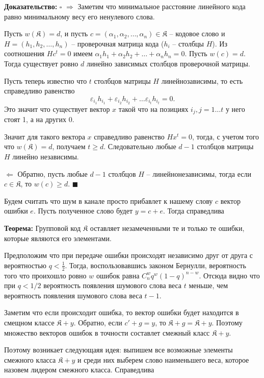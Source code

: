 \documentclass{article}
\newcommand{\THRM}[1] {
    \textbf{Теорема: } #1
}
\newcommand{\PROOF}[1] {
    \textbf{Доказательство: } $\square$ #1 $\blacksquare$
}
\newcommand{\eps}{\varepsilon}
\begin{document}
    \PROOF{
        $\Rightarrow$ Заметим что минимальное расстояние линейного кода равно минимальному весу его ненулевого слова.

        Пусть $w(\mathfrak{K}) = d$, и пусть $c = (\alpha_1, \alpha_2, \dots , \alpha_n) \in \mathfrak{K}$ -- кодовое слово 
        и $H = (h_1, h_2, \dots , h_n)$ -- проверочная матрица кода ($h_i$ -- столбцы $H$). Из соотношения $Hc^t = 0$ имеем
        $\alpha_1 h_1 + \alpha_2 h_2 + \dots + \alpha_n h_n = 0$. Пусть $w(c) = d$. Тогда существует ровно $d$ линейно зависимых
        столбцов проверочной матрицы.

        Пусть теперь известно что $t$ столбцов матрицы $H$ линейнозависимы, то есть справедливо равенство
        $$ \eps_{i_1} h_{i_1} + \eps_{i_2} h_{i_2} + \dots \eps_{i_t} h_{i_t} = 0. $$
        Это значит что существует вектор $x$ такой что на позициях $i_j, j = 1\dots t$ у него стоят 1, а на других 0.

        Значит для такого вектора $x$ справедливо равенство $Hx^t = 0$, тогда, с учетом того что $w(\mathfrak{K}) = d$, получаем $t \ge d$.
        Следовательно любые $d - 1$ столбцов матрицы $H$ линейно независимы.

        $\Leftarrow$ Обратно, пусть любые $d - 1$ столбцов $H$ -- линейнонезависимы, тогда если $c \in \mathfrak{K}$, то $w(c) \ge d$.
    }

    Будем считать что шум в канале просто прибавлет к нашему слову $c$ вектор ошибки $e$. Пусть полученное слово будет $y = c + e$. Тогда 
    справедлива

    \THRM{Групповой код $\mathfrak{K}$ оставляет незамеченными те и только те ошибки, которые являются его элементами.}

    Предположим что при передаче ошибки происходят независимо друг от друга с вероятностью $q < \frac{1}{2}$. Тогда, воспользовавшись
    законом Бернулли, вероятность того что проихошло ровно $w$ ошибок равна $C_n^w q^w(1 - q)^{n - w}$. Отсюда видно что при $q < 1/2$
    вероятность появления шумового слова веса $t$ меньше, чем вероятность появления шумового слова веса $t - 1$. 

    Заметим что если происходит ошибка, то вектор ошибки будет находится в смещном классе $\mathfrak{K} + y$. Обратно, если $c' + g = y$, 
    то $\mathfrak{K} + g = \mathfrak{K} + y$. Поэтому множество векторов ошибок в точности составлет смежный класс $\mathfrak{K} + y$.

    Поэтому возникает следующаяя идея: выпишем все возможные элементы смежного класса $\mathfrak{K} + y$ и среди них выберем слово
    наименьшего веса, которое назовем лидером смежного класса. Справедлива
\end{document}
